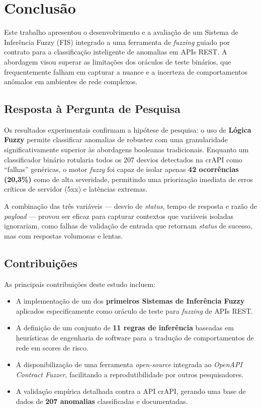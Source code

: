 \section{Conclusão}

Este trabalho apresentou o desenvolvimento e a avaliação de um Sistema de Inferência Fuzzy (FIS) integrado a uma ferramenta de \textit{fuzzing} guiado por contrato para a classificação inteligente de anomalias em APIs REST. A abordagem visou superar as limitações dos oráculos de teste binários, que frequentemente falham em capturar a nuance e a incerteza de comportamentos anômalos em ambientes de rede complexos.

\subsection{Resposta à Pergunta de Pesquisa}

Os resultados experimentais confirmam a hipótese de pesquisa: o uso de \textbf{Lógica Fuzzy} permite classificar anomalias de robustez com uma granularidade significativamente superior às abordagens booleanas tradicionais. Enquanto um classificador binário rotularia todos os 207 desvios detectados na crAPI \cite{crapi} como ``falhas'' genéricas, o motor \textit{fuzzy} foi capaz de isolar apenas \textbf{42 ocorrências (20,3\%)} como de alta severidade, permitindo uma priorização imediata de erros críticos de servidor (5xx) e latências extremas.

A combinação das três variáveis --- desvio de \textit{status}, tempo de resposta e razão de \textit{payload} --- provou ser eficaz para capturar contextos que variáveis isoladas ignorariam, como falhas de validação de entrada que retornam \textit{status} de sucesso, mas com respostas volumosas e lentas.

\subsection{Contribuições}

As principais contribuições deste estudo incluem:

\begin{itemize}
    \item A implementação de um dos \textbf{primeiros Sistemas de Inferência Fuzzy} aplicados especificamente como oráculo de teste para \textit{fuzzing} de APIs REST.
    \item A definição de um conjunto de \textbf{11 regras de inferência} baseadas em heurísticas de engenharia de software para a tradução de comportamentos de rede em scores de risco.
    \item A disponibilização de uma ferramenta \textit{open-source} integrada ao \textit{OpenAPI Contract Fuzzer}, facilitando a reprodutibilidade por outros pesquisadores.
    \item A validação empírica detalhada contra a API crAPI, gerando uma base de dados de \textbf{207 anomalias} classificadas e documentadas.
\end{itemize}

